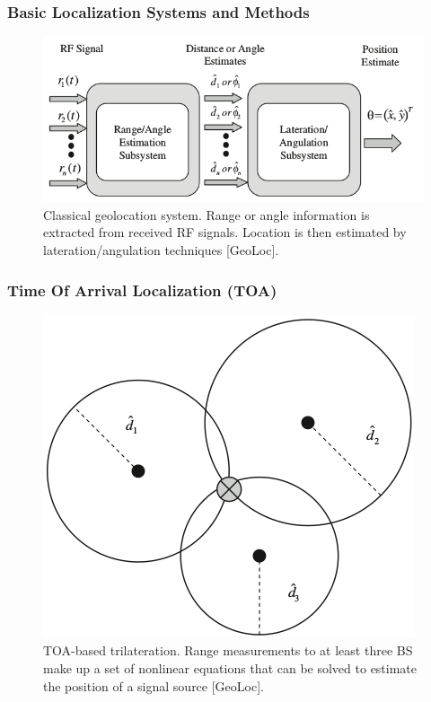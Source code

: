 \documentclass [t] {beamer} %
\begin{document}
\begin{frame} %
\frametitle{Basic Localization Systems and Methods}
\begin{figure}[h]
\includegraphics[width=1.0\textwidth]{../figures/localization_example.png}
\caption{Classical geolocation system. Range or angle information is extracted from received RF signals. Location is then estimated by lateration/angulation techniques [GeoLoc].}
\label{fig:2step}
\end{figure}
\end{frame}

\begin{frame} %
\frametitle{Time Of Arrival Localization (TOA)}
\begin{figure}[h]
\includegraphics[height=0.6\textheight]{../figures/toa_example.png}
\caption{TOA-based trilateration. Range measurements to at least three BS make
up a set of nonlinear equations that can be solved to estimate the position of a
signal source [GeoLoc].}
\label{fig:2step}
\end{figure}
\end{frame}
\end{document}
